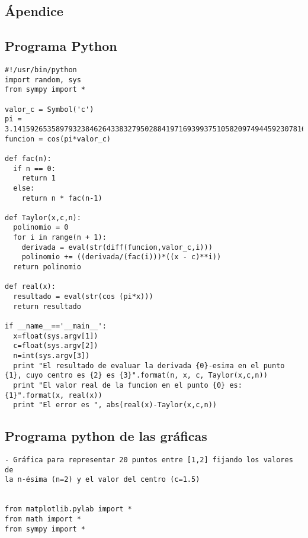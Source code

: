 \documentclass[spanish,a4paper,11pt,twoside]{report}
\begin{document}
\begin{appendix}
\chapter{Ápendice}
\label{appendix}
\section{Programa Python}
\label{Apendice1:XXX}

\begin{center}
\begin{footnotesize}
\begin{verbatim}
#!/usr/bin/python 
import random, sys
from sympy import *

valor_c = Symbol('c')
pi = 3.141592653589793238462643383279502884197169399375105820974944592307816406286
funcion = cos(pi*valor_c)

def fac(n):
  if n == 0:
    return 1 
  else:
    return n * fac(n-1)

def Taylor(x,c,n):
  polinomio = 0
  for i in range(n + 1):
    derivada = eval(str(diff(funcion,valor_c,i)))
    polinomio += ((derivada/(fac(i)))*((x - c)**i))
  return polinomio

def real(x):
  resultado = eval(str(cos (pi*x)))
  return resultado

if __name__=='__main__': 
  x=float(sys.argv[1])
  c=float(sys.argv[2])
  n=int(sys.argv[3])
  print "El resultado de evaluar la derivada {0}-esima en el punto {1}, cuyo centro es {2} es {3}".format(n, x, c, Taylor(x,c,n))
  print "El valor real de la funcion en el punto {0} es: {1}".format(x, real(x))
  print "El error es ", abs(real(x)-Taylor(x,c,n))
\end{verbatim}
\end{footnotesize}
\end{center}

\section{Programa python de las gráficas}
\label{Apendice1:YYY}
\begin{center}
\begin{footnotesize}
\begin{verbatim}
- Gráfica para representar 20 puntos entre [1,2] fijando los valores de
la n-ésima (n=2) y el valor del centro (c=1.5)


from matplotlib.pylab import *
from math import *
from sympy import *


\end{verbatim}
\end{footnotesize}
\end{center}
\end{appendix}
\end{document}
